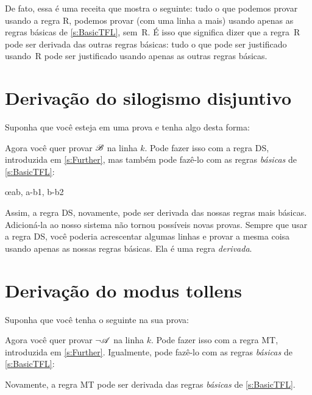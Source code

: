 De fato, essa é uma receita que mostra o seguinte: tudo o que podemos provar usando a regra R, podemos provar (com uma linha a mais) usando apenas as regras básicas de \cref{s:BasicTFL}, sem~R. É isso que significa dizer que a regra~R pode ser derivada das outras regras básicas: tudo o que pode ser justificado usando~R pode ser justificado usando apenas as outras regras básicas.


\section{Derivação do silogismo disjuntivo}
Suponha que você esteja em uma prova e tenha algo desta forma:
\begin{fitchproof}
\end{fitchproof}
Agora você quer provar $\mathscr{B}$ na linha $k$. Pode fazer isso com a regra DS, introduzida em \cref{s:Further}, mas também pode fazê-lo com as regras \emph{básicas} de \cref{s:BasicTFL}:
	\begin{fitchproof}
		\open
			\AS
		\close
		\open
			\AS
		\close
	\oe{ab, a-b1, b-b2}
\end{fitchproof}
Assim, a regra DS, novamente, pode ser derivada das nossas regras mais básicas. Adicioná-la ao nosso sistema não tornou possíveis novas provas. Sempre que usar a regra DS, você poderia acrescentar algumas linhas e provar a mesma coisa usando apenas as nossas regras básicas. Ela é uma regra \emph{derivada}.

\section{Derivação do modus tollens}
Suponha que você tenha o seguinte na sua prova:
\begin{fitchproof}
\end{fitchproof}
Agora você quer provar $\neg \mathscr{A}$ na linha $k$. Pode fazer isso com a regra MT, introduzida em \cref{s:Further}. Igualmente, pode fazê-lo com as regras \emph{básicas} de \cref{s:BasicTFL}:
\begin{fitchproof}
		\open
		\AS
		\close
\end{fitchproof}
Novamente, a regra MT pode ser derivada das regras \emph{básicas} de \cref{s:BasicTFL}.

